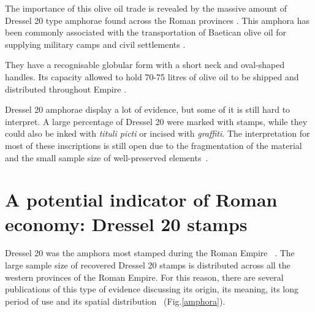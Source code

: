 The importance of this olive oil trade is revealed by the massive amount of Dressel 20 type amphorae found across the Roman provinces \citep{dressel_ricerche_1878,
millet_anforas_1998}. This amphora has been commonly associated with the transportation of Baetican olive oil for supplying military camps and civil settlements \citep{berni_millet_epigrafianforica_2008}.

They have a recognisable globular form with a short neck and oval-shaped handles. Its capacity allowed to hold 70-75 litres of olive oil to be shipped and distributed throughout Empire \citep{berni_dressel_2016}.


Dressel 20 amphorae display a lot of evidence, but some of it is still hard to interpret. A large percentage of Dressel 20 were marked with stamps, while they could also be inked with \textit{tituli picti} or incised with \textit{graffiti}. The interpretation for most of these inscriptions is still open due to the fragmentation of the material and the small sample size of well-preserved elements~\citep{aguilera_evolucion_2007,rovira_guardiola_grafitos_2007}. 


\section{A potential indicator of Roman economy: Dressel 20 stamps}
\label{sec:2}


Dressel 20 was the amphora most stamped during the Roman Empire ~\citep[18]{millet_anforas_1998}. The large sample size of recovered Dressel 20 stamps is distributed across all the western provinces of the Roman Empire. For this reason, there are several publications of this type of evidence discussing its origin, its meaning, its long period of use and its spatial distribution~\citep{dressel_ricerche_1878,
rodriguez_economioleicola_1977,
chicepi1985,millet_anforas_1998, remesal_sellar_2016} (Fig.\ref{amphora}).


